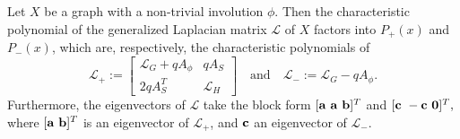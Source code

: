 \documentclass[10pt,a4paper]{amsart}
\def \a {{\bf a}}
\def \b {{\bf b}}
\def \c {{\bf c}}
\def \o {{\bf 0}}
\begin{document}
\begin{lem} \label{L1}
Let $X$ be a graph with a non-trivial involution $\phi.$ Then the characteristic polynomial of the generalized Laplacian matrix $\mathscr{L}$ of $X$ factors into $P_+(x)$ and $P_-(x)$, which are, respectively, the characteristic polynomials of $$\mathscr{L}_+:=\begin{bmatrix}
		\mathscr{L}_G+qA_\phi& qA_S\\
		2qA_S^T &\mathscr{L}_H
	\end{bmatrix}\quad \text{and}\quad \mathscr{L}_-:=\mathscr{L}_G-qA_\phi.$$
Furthermore, the eigenvectors of $\mathscr{L}$ take the block form $[\a~\a~\b]^T$ and $[\c~-\c~ \o]^T,$ where $[\a~ \b]^T$ is an eigenvector of $\mathscr{L}_+$, and $\c$ an eigenvector of $\mathscr{L}_-.$ 
 \end{lem}
\end{document}

